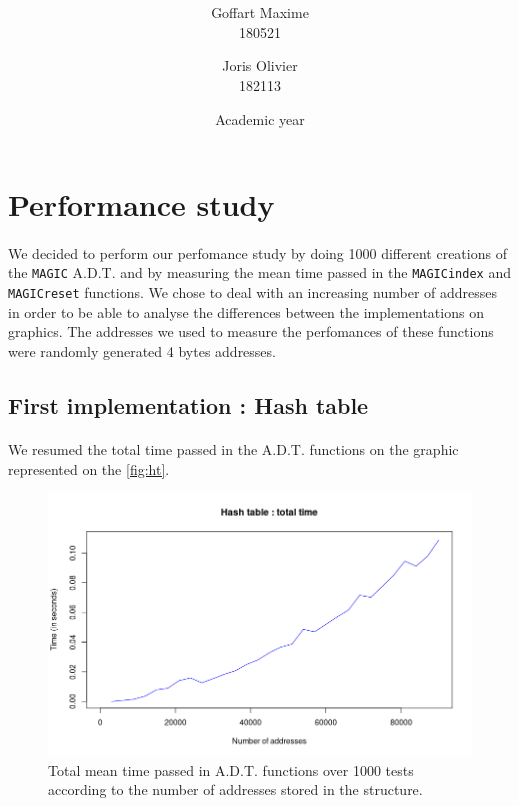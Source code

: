 \documentclass[a4paper, 11pt, oneside]{article}
\title{\ClassName\\\vspace*{0.8cm}\ProjectName\vspace{0.8cm}}
\author{Goffart Maxime \\180521 \and Joris Olivier \\ 182113}
\date{\vspace{1cm}Academic year \AcademicYear}
\begin{document}
\begin{titlingpage}
{\let\newpage\relax\maketitle}
\end{titlingpage}

\section{Performance study}
\paragraph{}We decided to perform our perfomance study by doing 1000 different creations of the \texttt{MAGIC} A.D.T. and by measuring the mean time passed in the \texttt{MAGICindex} and \texttt{MAGICreset} functions. We chose to deal with an increasing number of addresses in order to be able to analyse the differences between the implementations on graphics. The addresses we used to measure the perfomances of these functions were randomly generated 4 bytes addresses.
\subsection{First implementation : Hash table}
\paragraph{}We resumed the total time passed in the A.D.T. functions on the graphic represented on the \autoref{fig:ht}. 
\begin{figure}[H]
  \centering
  \includegraphics[scale=0.6]{plots/ht_total.png} 
  \caption{Total mean time passed in A.D.T. functions over 1000 tests according to the number of addresses stored in the structure.}\label{fig:ht}
\end{figure}
\end{document}
